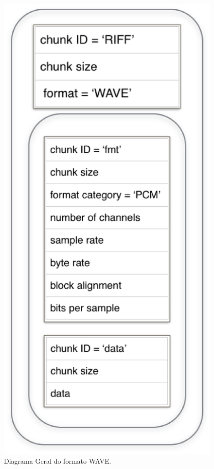  \begin{figure}[ht]
	\centering
		\includegraphics[keepaspectratio=true,scale=0.5]{figuras/wave.eps}
	\caption{Diagrama Geral do formato WAVE.}
	\label{wave}
\end{figure}

